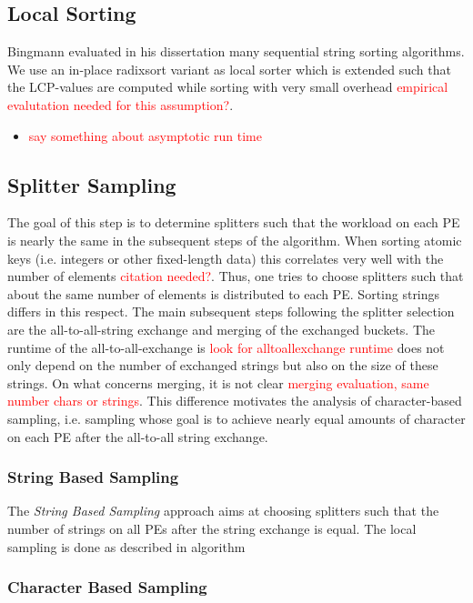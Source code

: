 \subsection{Local Sorting}
Bingmann evaluated in his dissertation \cite{bingmann2018scalable} many sequential string sorting algorithms. We use an in-place radixsort variant as local sorter which is extended such that the LCP-values are computed while sorting with very small overhead \textcolor{red}{empirical evalutation needed for this assumption?}.

\begin{itemize}
	\item \textcolor{red}{say something about asymptotic run time}
\end{itemize}

\subsection{Splitter Sampling}
The goal of this step is to determine splitters such that the workload on each PE is nearly the same in the subsequent steps of the algorithm. When sorting atomic keys (i.e. integers or other fixed-length data) this correlates very well with the number of elements \textcolor{red}{citation needed?}. Thus, one tries to choose splitters such that about the same number of elements is distributed to each PE. Sorting strings differs in this respect. The main subsequent steps following the splitter selection are the all-to-all-string exchange and merging of the exchanged buckets. The runtime of the all-to-all-exchange is \textcolor{red}{look for alltoallexchange runtime} does not only depend on the number of exchanged strings but also on the size of these strings. On what concerns merging, it is not clear \textcolor{red}{merging evaluation, same number chars or strings}. 
This difference motivates the analysis of character-based sampling, i.e. sampling whose goal is to achieve nearly equal amounts of character on each PE after the all-to-all string exchange.

\subsubsection{String Based Sampling}
The \emph{String Based Sampling} approach aims at choosing splitters such that the number of strings on all PEs after the string exchange is equal. The local sampling is done as described in algorithm
\subsubsection{Character Based Sampling}



